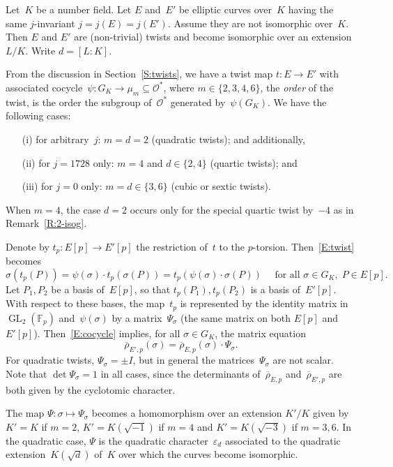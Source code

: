 \documentclass[12pt, reqno]{amsart}
\newcommand{\F}{\mathbb{F}}
\newcommand{\rhobar}{{\overline{\rho}}}
\newcommand{\calO}{\mathcal{O}}
\newcommand{\GL}{\operatorname{GL}}
\numberwithin{equation}{section}
\theoremstyle{definition}
\theoremstyle{remark}
\begin{document}
Let~$K$ be a number field. Let $E$ and~$E'$ be elliptic curves
over~$K$ having the same $j$-invariant $j = j(E) = j(E')$. Assume they
are not isomorphic over~$K$. Then $E$ and $E'$ are (non-trivial)
twists and become isomorphic over an extension $L/K$. Write $d = [L :
  K]$.

From the discussion in Section~\ref{S:twists}, we have a twist map $t : E \to E'$ with
associated cocycle~$\psi : G_K \to \mu_m \subseteq\calO^*$, where
$m\in\{2,3,4,6\}$, the \emph{order} of the twist, is the order the
subgroup of~$\calO^*$ generated by~$\psi(G_K)$.  We have the following
cases:
\begin{itemize}
 \item[(i)] for arbitrary~$j$: $m=d=2$ (quadratic twists); and
   additionally,
 \item[(ii)] for $j = 1728$ only: $m=4$ and $d \in \{2,4\}$  (quartic
   twists); and
  \item[(iii)] for $j = 0$ only: $m=d\in\{3,6\}$ (cubic or sextic twists).
\end{itemize}

When $m=4$, the case $d=2$ occurs only for the special
quartic twist by~$-4$ as in Remark~\ref{R:2-isog}.

Denote by $t_p : E[p] \to E'[p]$ the restriction of~$t$ to the
$p$-torsion. Then~\eqref{E:twist} becomes
\begin{equation}\label{E:cocycle}
  \sigma(t_p(P)) = \psi(\sigma) \cdot t_p(\sigma(P))
                 = t_p(\psi(\sigma)\cdot\sigma(P)) 
   \quad \text{ for all } \sigma \in G_K,
  \; P \in E[p].
\end{equation}
Let $P_1, P_2$ be a basis of~$E[p]$, so that $t_p(P_1), t_p(P_2)$ is a
basis of~$E'[p]$.  With respect to these bases, the map~$t_p$ is
represented by the identity matrix in~$\GL_2(\F_p)$ and~$\psi(\sigma)$
by a matrix~$\Psi_\sigma$ (the same matrix on both $E[p]$
and~$E'[p]$).  Then~\eqref{E:cocycle} implies, for all $\sigma \in
G_K$, the matrix equation
\begin{equation} \label{E:PsiMatrix}
 \rhobar_{E',p}(\sigma) = \rhobar_{E,p}(\sigma) \cdot \Psi_\sigma. 
\end{equation}
For quadratic twists, $\Psi_\sigma=\pm I$, but in general the
matrices~$\Psi_\sigma$ are not scalar.  Note that
$\det\Psi_\sigma=1$ in all cases, since the determinants
of~$\rhobar_{E,p}$ and~$\rhobar_{E',p}$ are both given by the
cyclotomic character.

The map $\Psi : \sigma \mapsto \Psi_\sigma$ becomes a homomorphism
over an extension $K'/K$ given by $K'=K$ if $m=2$, $K'=K(\sqrt{-1})$
if $m=4$ and $K'=K(\sqrt{-3})$ if $m=3,6$. In the quadratic case,
$\Psi$ is the quadratic character~$\varepsilon_d$ associated to the
quadratic extension~$K(\sqrt{d})$ of~$K$ over which the curves become
isomorphic.
\end{document}
